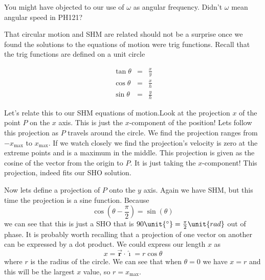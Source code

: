\documentclass{book}
\begin{document}
You might have objected to our use of $\omega $ as angular frequency. Didn't 
$\omega $ mean angular speed in PH121?

That circular motion and SHM are related should not be a surprise once we
found the solutions to the equations of motion were trig functions. Recall
that the trig functions are defined on a unit circle

%
\begin{eqnarray}
\tan \theta &=&\frac{x}{y} \\
\cos \theta &=&\frac{x}{h} \\
\sin \theta &=&\frac{y}{h}
\end{eqnarray}

Let's relate this to our SHM equations of motion.Look at the projection $x$ of the
point $P$ on the $x$ axis. This is just the $x$-component of the position!
Lets follow this projection as $P$ travels around the circle. We find the
projection ranges from $-x_{\max }$ to $x_{\max }.$ If we watch closely we
find the projection's velocity is zero at the extreme points and is a
maximum in the middle. This projection is given as the cosine of the vector
from the origin to $P.$ It is just taking the $x$-component! This
projection, indeed fits our SHO solution.

Now lets define a projection of $P$ onto the $y$ axis. Again we have SHM,
but this time the projection is a sine function. Because 
\begin{equation}
\cos \left( \theta -\frac{\pi }{2}\right) =\sin \left( \theta \right)
\end{equation}%
we can see that this is just a SHO that is $90\unit{%
{{}^\circ}%
}=\frac{\pi }{2}\unit{rad}$ out of phase. It is probably worth recalling
that a projection of one vector on another can be expressed by a dot
product. We could express our length $x$ as 
\begin{equation*}
x=\overrightarrow{\mathbf{r}}\cdot \mathbf{\hat{\imath}}=r\cos \theta
\end{equation*}%
where $r$ is the radius of the circle. We can see that when $\theta =0$
we have $x=r$ and this will be the largest $x$ value, so $r=x_{\max }.$
\end{document}
